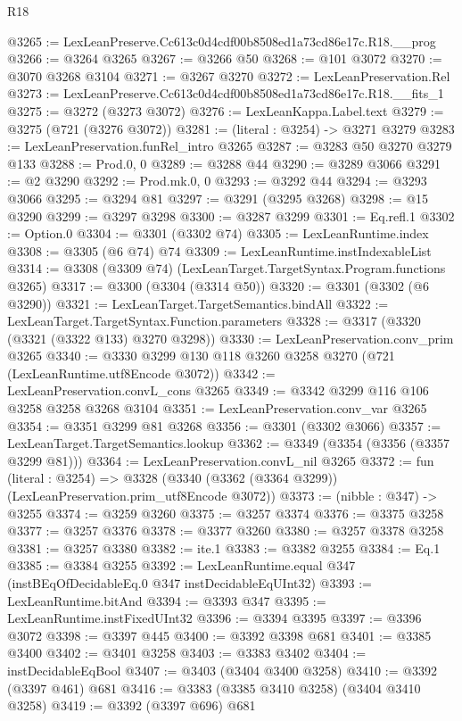 \begin{lexlean}{R18}
\begin{coremodule}
@3265 := LexLeanPreserve.Cc613c0d4cdf00b8508ed1a73cd86e17c.R18.__prog
@3266 := @3264 @3265
@3267 := @3266 @50
@3268 := @101 @3072
@3270 := @3070 @3268 @3104
@3271 := @3267 @3270
@3272 := LexLeanPreservation.Rel
@3273 := LexLeanPreserve.Cc613c0d4cdf00b8508ed1a73cd86e17c.R18.__fits_1
@3275 := @3272 (@3273 @3072)
@3276 := LexLeanKappa.Label.text
@3279 := @3275 (@721 (@3276 @3072))
@3281 := (literal : @3254) -> @3271 @3279
@3283 := LexLeanPreservation.funRel_intro @3265
@3287 := @3283 @50 @3270 @3279 @133
@3288 := Prod.{0, 0}
@3289 := @3288 @44
@3290 := @3289 @3066
@3291 := @2 @3290
@3292 := Prod.mk.{0, 0}
@3293 := @3292 @44
@3294 := @3293 @3066
@3295 := @3294 @81
@3297 := @3291 (@3295 @3268)
@3298 := @15 @3290
@3299 := @3297 @3298
@3300 := @3287 @3299
@3301 := Eq.refl.{1}
@3302 := Option.{0}
@3304 := @3301 (@3302 @74)
@3305 := LexLeanRuntime.index
@3308 := @3305 (@6 @74) @74
@3309 := LexLeanRuntime.instIndexableList
@3314 := @3308 (@3309 @74) (LexLeanTarget.TargetSyntax.Program.functions @3265)
@3317 := @3300 (@3304 (@3314 @50))
@3320 := @3301 (@3302 (@6 @3290))
@3321 := LexLeanTarget.TargetSemantics.bindAll
@3322 := LexLeanTarget.TargetSyntax.Function.parameters
@3328 := @3317 (@3320 (@3321 (@3322 @133) @3270 @3298))
@3330 := LexLeanPreservation.conv_prim @3265
@3340 := @3330 @3299 @130 @118 @3260 @3258 @3270 (@721 (LexLeanRuntime.utf8Encode @3072))
@3342 := LexLeanPreservation.convL_cons @3265
@3349 := @3342 @3299 @116 @106 @3258 @3258 @3268 @3104
@3351 := LexLeanPreservation.conv_var @3265
@3354 := @3351 @3299 @81 @3268
@3356 := @3301 (@3302 @3066)
@3357 := LexLeanTarget.TargetSemantics.lookup
@3362 := @3349 (@3354 (@3356 (@3357 @3299 @81)))
@3364 := LexLeanPreservation.convL_nil @3265
@3372 := fun (literal : @3254) =>
  @3328 (@3340 (@3362 (@3364 @3299)) (LexLeanPreservation.prim_utf8Encode @3072))
@3373 := (nibble : @347) -> @3255
@3374 := @3259 @3260
@3375 := @3257 @3374
@3376 := @3375 @3258
@3377 := @3257 @3376
@3378 := @3377 @3260
@3380 := @3257 @3378 @3258
@3381 := @3257 @3380
@3382 := ite.{1}
@3383 := @3382 @3255
@3384 := Eq.{1}
@3385 := @3384 @3255
@3392 := LexLeanRuntime.equal @347 (instBEqOfDecidableEq.{0} @347 instDecidableEqUInt32)
@3393 := LexLeanRuntime.bitAnd
@3394 := @3393 @347
@3395 := LexLeanRuntime.instFixedUInt32
@3396 := @3394 @3395
@3397 := @3396 @3072
@3398 := @3397 @445
@3400 := @3392 @3398 @681
@3401 := @3385 @3400
@3402 := @3401 @3258
@3403 := @3383 @3402
@3404 := instDecidableEqBool
@3407 := @3403 (@3404 @3400 @3258)
@3410 := @3392 (@3397 @461) @681
@3416 := @3383 (@3385 @3410 @3258) (@3404 @3410 @3258)
@3419 := @3392 (@3397 @696) @681

\end{coremodule}
\end{lexlean}
